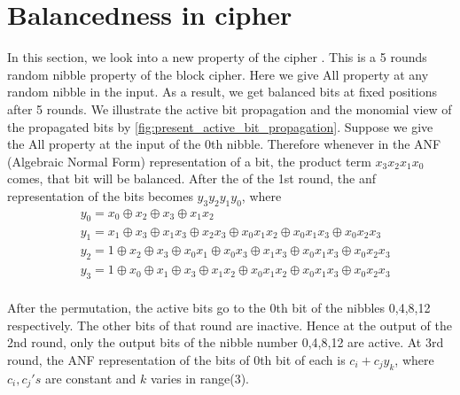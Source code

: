 \section{Balancedness in \present cipher}	\label{sec:present_random_nibble_explanation}
In this section, we look into a new property of the cipher \present. This is a 5 rounds random nibble property of the block cipher. Here we give All property at any random nibble in the input. As a result, we get balanced bits at fixed positions after 5 rounds. We illustrate the active bit propagation and the monomial view of the propagated bits by \autoref{fig:present_active_bit_propagation}. Suppose we give the All property at the input of the 0th nibble. Therefore whenever in the ANF (Algebraic Normal Form) representation of a bit, the product term $x_3x_2x_1x_0$ comes, that bit will be balanced. After the \sbb of the 1st round, the anf representation of the bits becomes $y_3y_2y_1y_0$, where \begin{align*}
	& y_0 = x_0 \oplus x_2 \oplus x_3 \oplus x_1x_2	\\
	& y_1 = x_1 \oplus x_3 \oplus x_1x_3 \oplus x_2x_3 \oplus x_0x_1x_2 \oplus x_0x_1x_3 \oplus x_0x_2x_3	\\
	& y_2 = 1 \oplus x_2 \oplus x_3 \oplus x_0x_1 \oplus x_0x_3 \oplus x_1x_3 \oplus x_0x_1x_3 \oplus x_0x_2x_3	\\
	& y_3 = 1 \oplus x_0 \oplus x_1 \oplus x_3 \oplus x_1x_2 \oplus x_0x_1x_2 \oplus x_0x_1x_3 \oplus x_0x_2x_3	\\
\end{align*}

After the permutation, the active bits go to the 0th bit of the nibbles 0,4,8,12 respectively. The other bits of that round are inactive. Hence at the output of the 2nd round, only the output bits of the nibble number 0,4,8,12 are active. At 3rd round, the ANF representation of the bits of 0th bit of each \sbb is $c_i + c_j y_k$, where $c_i, c_j's$ are constant and $k$ varies in range(3).


